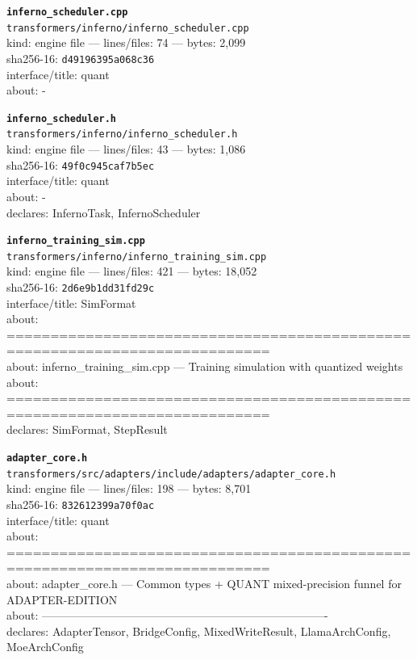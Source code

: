 \noindent\textbf{\texttt{inferno\_scheduler.cpp}}\\
\texttt{transformers/inferno/inferno\_scheduler.cpp}\\
kind: engine file --- lines/files: 74 --- bytes: 2,099\\
sha256-16: \texttt{d49196395a068c36}\\
interface/title: quant\\
about: -\\
\vspace*{6.0pt}

\noindent\textbf{\texttt{inferno\_scheduler.h}}\\
\texttt{transformers/inferno/inferno\_scheduler.h}\\
kind: engine file --- lines/files: 43 --- bytes: 1,086\\
sha256-16: \texttt{49f0c945caf7b5ec}\\
interface/title: quant\\
about: -\\
declares: InfernoTask, InfernoScheduler\\
\vspace*{6.0pt}

\noindent\textbf{\texttt{inferno\_training\_sim.cpp}}\\
\texttt{transformers/inferno/inferno\_training\_sim.cpp}\\
kind: engine file --- lines/files: 421 --- bytes: 18,052\\
sha256-16: \texttt{2d6e9b1dd31fd29c}\\
interface/title: SimFormat\\
about: ============================================================================\\
about: inferno\_training\_sim.cpp — Training simulation with quantized weights\\
about: ============================================================================\\
declares: SimFormat, StepResult\\
\vspace*{6.0pt}

\noindent\textbf{\texttt{adapter\_core.h}}\\
\texttt{transformers/src/adapters/include/adapters/adapter\_core.h}\\
kind: engine file --- lines/files: 198 --- bytes: 8,701\\
sha256-16: \texttt{832612399a70f0ac}\\
interface/title: quant\\
about: ============================================================================\\
about: adapter\_core.h — Common types + QUANT mixed-precision funnel for ADAPTER-EDITION\\
about: ----------------------------------------------------------------------------\\
declares: AdapterTensor, BridgeConfig, MixedWriteResult, LlamaArchConfig, MoeArchConfig\\
\vspace*{6.0pt}
\newpage

